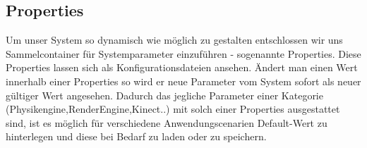\begin{Spacing}{\mylinespace}
\section{Properties}
Um unser System so dynamisch wie möglich zu gestalten entschlossen wir uns Sammelcontainer für Systemparameter einzuführen - sogenannte Properties.
Diese Properties lassen sich als Konfigurationsdateien ansehen. Ändert man einen Wert innerhalb einer Properties so wird er neue Parameter vom System sofort als neuer gültiger Wert angesehen.
Dadurch das jegliche Parameter einer Kategorie (Physikengine,RenderEngine,Kinect..) mit solch einer Properties ausgestattet sind, ist es möglich für verschiedene Anwendungscenarien Default-Wert zu hinterlegen und diese bei Bedarf zu laden oder zu speichern.

\end{Spacing}
\newpage
\clearpage
